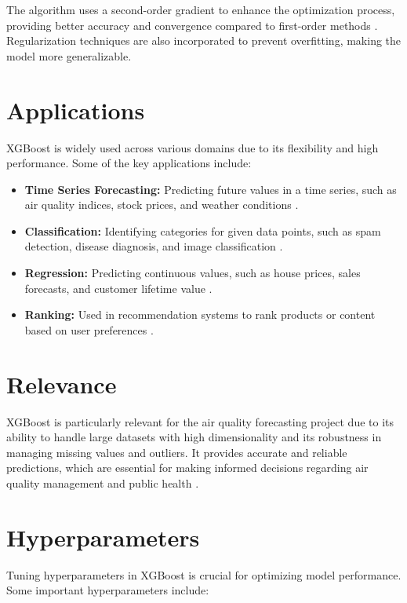 The algorithm uses a second-order gradient to enhance the optimization process, providing better accuracy and convergence compared to first-order methods \cite{Chen:2016}. Regularization techniques are also incorporated to prevent overfitting, making the model more generalizable.

\section{Applications}

XGBoost is widely used across various domains due to its flexibility and high performance. Some of the key applications include:

\begin{itemize}
	\item \textbf{Time Series Forecasting:} Predicting future values in a time series, such as air quality indices, stock prices, and weather conditions \cite{Aggarwal:2015}.
	\item \textbf{Classification:} Identifying categories for given data points, such as spam detection, disease diagnosis, and image classification \cite{Goodfellow:2016}.
	\item \textbf{Regression:} Predicting continuous values, such as house prices, sales forecasts, and customer lifetime value \cite{Aggarwal:2015}.
	\item \textbf{Ranking:} Used in recommendation systems to rank products or content based on user preferences \cite{Chen:2016}.
\end{itemize}

\section{Relevance}

XGBoost is particularly relevant for the air quality forecasting project due to its ability to handle large datasets with high dimensionality and its robustness in managing missing values and outliers. It provides accurate and reliable predictions, which are essential for making informed decisions regarding air quality management and public health \cite{Chen:2016}.

\section{Hyperparameters}

Tuning hyperparameters in XGBoost is crucial for optimizing model performance. Some important hyperparameters include:

